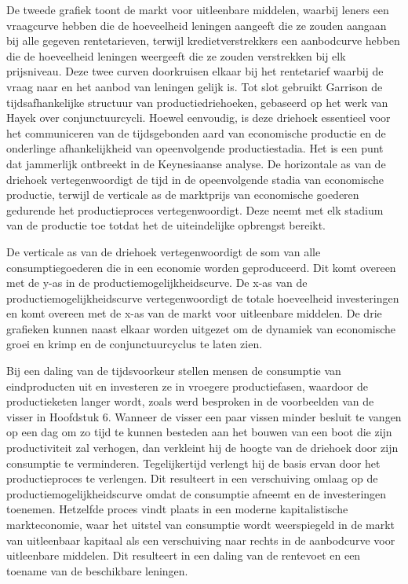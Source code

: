 De tweede grafiek toont de markt voor uitleenbare middelen, waarbij leners een vraagcurve hebben die de hoeveelheid leningen aangeeft die ze zouden aangaan bij alle gegeven rentetarieven, terwijl kredietverstrekkers een aanbodcurve hebben die de hoeveelheid leningen weergeeft die ze zouden verstrekken bij elk prijsniveau. Deze twee curven doorkruisen elkaar bij het rentetarief waarbij de vraag naar en het aanbod van leningen gelijk is. Tot slot gebruikt Garrison de tijdsafhankelijke structuur van productiedriehoeken, gebaseerd op het werk van Hayek over conjunctuurcycli.\autocite{176} Hoewel eenvoudig, is deze driehoek essentieel voor het communiceren van de tijdsgebonden aard van economische productie en de onderlinge afhankelijkheid van opeenvolgende productiestadia. Het is een punt dat jammerlijk  ontbreekt in de Keynesiaanse analyse. De horizontale as van de driehoek vertegenwoordigt de tijd in de opeenvolgende stadia van economische productie, terwijl de verticale as de marktprijs van economische goederen gedurende het productieproces vertegenwoordigt. Deze neemt met elk stadium van de productie toe totdat het de uiteindelijke opbrengst bereikt.

De verticale as van de driehoek vertegenwoordigt de som van alle consumptiegoederen die in een economie worden geproduceerd. Dit komt overeen met de y-as in de productiemogelijkheidscurve. De x-as van de productiemogelijkheidscurve vertegenwoordigt de totale hoeveelheid investeringen en komt overeen met de x-as van de markt voor uitleenbare middelen. De drie grafieken kunnen naast elkaar worden uitgezet om de dynamiek van economische groei en krimp en de conjunctuurcyclus te laten zien.

Bij een daling van de tijdsvoorkeur stellen mensen de consumptie van eindproducten uit en investeren ze in vroegere productiefasen, waardoor de productieketen langer wordt, zoals werd besproken in de voorbeelden van de visser in Hoofdstuk 6. Wanneer de visser een paar vissen minder besluit te vangen op een dag om zo tijd te kunnen besteden aan het bouwen van een boot die zijn productiviteit zal verhogen, dan verkleint hij de hoogte van de driehoek door zijn consumptie te verminderen. Tegelijkertijd verlengt hij de basis ervan door het productieproces te verlengen. Dit resulteert in een verschuiving omlaag op de productiemogelijkheidscurve omdat de consumptie afneemt en de investeringen toenemen. Hetzelfde proces vindt plaats in een moderne kapitalistische markteconomie, waar het uitstel van consumptie wordt weerspiegeld in de markt van uitleenbaar kapitaal als een verschuiving naar rechts in de aanbodcurve voor uitleenbare middelen. Dit resulteert in een daling van de rentevoet en een toename van de beschikbare leningen.

